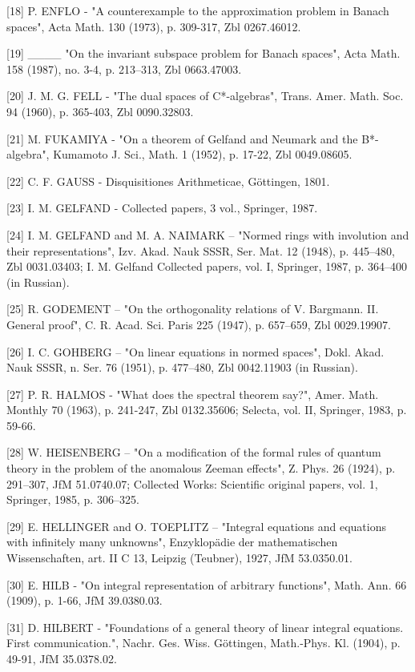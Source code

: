 {[}18{]} P. ENFLO - "A counterexample to the approximation problem in Banach spaces", Acta Math. 130 (1973), p. 309-317, Zbl 0267.46012.

{[}19{]} \_\_\_\_ "On the invariant subspace problem for Banach spaces", Acta Math. 158 (1987), no. 3-4, p. 213--313, Zbl 0663.47003.

{[}20{]} J. M. G. FELL - "The dual spaces of C*-algebras", Trans. Amer. Math. Soc. 94 (1960), p. 365-403, Zbl 0090.32803.

{[}21{]} M. FUKAMIYA - "On a theorem of Gelfand and Neumark and the B*-algebra", Kumamoto J. Sci., Math. 1 (1952), p. 17-22, Zbl 0049.08605.

{[}22{]} C. F. GAUSS - Disquisitiones Arithmeticae, Göttingen, 1801.

{[}23{]} I. M. GELFAND - Collected papers, 3 vol., Springer, 1987.

{[}24{]} I. M. GELFAND and M. A. NAIMARK -- "Normed rings with involution and their representations", Izv. Akad. Nauk SSSR, Ser. Mat. 12 (1948), p. 445--480, Zbl 0031.03403; I. M. Gelfand Collected papers, vol. I, Springer, 1987, p. 364--400 (in Russian).

{[}25{]} R. GODEMENT -- "On the orthogonality relations of V. Bargmann. II. General proof", C. R. Acad. Sci. Paris 225 (1947), p. 657--659, Zbl 0029.19907.

{[}26{]} I. C. GOHBERG -- "On linear equations in normed spaces", Dokl. Akad. Nauk SSSR, n. Ser. 76 (1951), p. 477--480, Zbl 0042.11903 (in Russian).

{[}27{]} P. R. HALMOS - "What does the spectral theorem say?", Amer. Math. Monthly 70 (1963), p. 241-247, Zbl 0132.35606; Selecta, vol. II, Springer, 1983, p. 59-66.

{[}28{]} W. HEISENBERG -- "On a modification of the formal rules of quantum theory in the problem of the anomalous Zeeman effects", Z. Phys. 26 (1924), p. 291--307, JfM 51.0740.07; Collected Works: Scientific original papers, vol. 1, Springer, 1985, p. 306--325.

{[}29{]} E. HELLINGER and O. TOEPLITZ -- "Integral equations and equations with infinitely many unknowns", Enzyklopädie der mathematischen Wissenschaften, art. II C 13, Leipzig (Teubner), 1927, JfM 53.0350.01.

{[}30{]} E. HILB - "On integral representation of arbitrary functions", Math. Ann. 66 (1909), p. 1-66, JfM 39.0380.03.

{[}31{]} D. HILBERT - "Foundations of a general theory of linear integral equations. First communication.", Nachr. Ges. Wiss. Göttingen, Math.-Phys. Kl. (1904), p. 49-91, JfM 35.0378.02.

